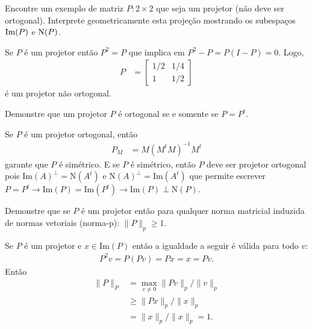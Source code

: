 \begin{questions}
    \question Encontre um exemplo de matriz $P : 2 \times 2$ que seja um projetor (n\~{a}o deve ser ortogonal). Interprete geometricamente esta proje\c{c}\~{a}o mostrando os subespa\c{c}os $\text{Im}(P)$ e $\text{N}(P)$.
    \begin{solution}
        Se $P$ \'{e} um projetor ent\~{a}o $P^2 = P$ que implica em $P^2 - P = P(I - P) = 0$. Logo,
        \begin{align*}
            P &= \begin{bmatrix}
                1 / 2 & 1 / 4 \\
                1 & 1 / 2
            \end{bmatrix}
        \end{align*}
        \'{e} um projetor n\~{a}o ortogonal.
    \end{solution}

     Demonstre que um projetor $P$ \'{e} ortogonal se e somente se $P = P^t$.
    \begin{solution}
        Se $P$ \'{e} um projetor ortogonal, ent\~{a}o
        \begin{align*}
            P_M &= M \left( M^t M \right)^{-1} M^t
        \end{align*}
        garante que $P$ \'{e} sim\'{e}trico. E se $P$ \'{e} sim\'{e}trico, ent\~{a}o $P$ deve ser projetor ortogonal pois $\text{Im}(A)^\perp = \text{N}(A^t)$ e $\text{N}(A)^\perp = \text{Im}(A^t)$ que permite escrever $P = P^t \rightarrow \text{Im}(P) = \text{Im}(P^t) \rightarrow \text{Im}(P) \perp \text{N}(P)$.
    \end{solution}

    \question Demonstre que se $P$ \'{e} um projetor ent\~{a}o para qualquer norma matricial induzida de normas vetoriais (norma-p): $\| P \|_p \geq 1$.
    \begin{solution}
        Se $P$ \'{e} um projetor e $x \in \text{Im}(P)$ ent\~{a}o a igualdade a seguir \'{e} v\'{a}lida para todo $v$:
        \begin{align*}
            P^2 v = P \left( P v \right) = P x = x = P v.
        \end{align*}
        Ent\~{a}o
        \begin{align*}
            \| P \|_P &= \max_{v \neq 0} \| P v \|_p / \| v \|_p \\
            &\geq \| P x \|_p / \| x \|_p \\
            &= \| x \|_p / \| x \|_p = 1.
        \end{align*}
    \end{solution}


\end{questions}
